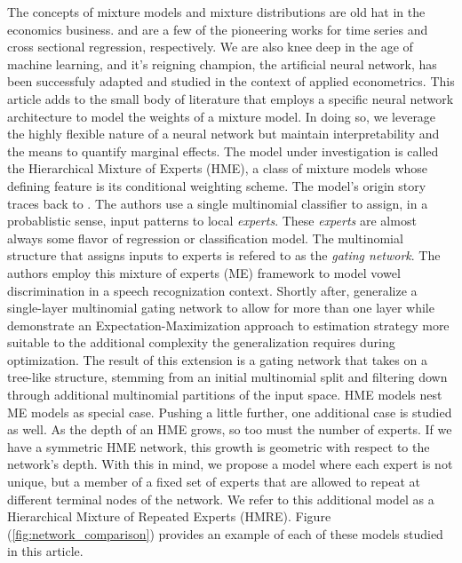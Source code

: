\documentclass[12pt]{article}
\begin{document}
The concepts of mixture models and mixture distributions are old hat
in the economics business. \cite{Hamilton1989} and \cite{GoldfeldQuant1973}
are a few of the pioneering works for time series and cross sectional
regression, respectively. We are also knee deep in the age of machine
learning, and it's reigning champion, the artificial neural network, has
been successfuly adapted and studied in the context of applied econometrics.
This article adds to the small body of literature that employs a specific
neural network architecture to model the weights of a mixture model. In doing
so, we leverage the highly flexible nature of a neural network but maintain
interpretability and the means to quantify marginal effects.
The model under investigation is called the Hierarchical Mixture
of Experts (HME), a class of mixture models whose defining feature is 
its conditional weighting scheme. The model's origin story traces back to \cite{JJNH1991}.
The authors use a single multinomial classifier to assign, in a probablistic
sense, input patterns to local \textit{experts}. These \textit{experts} are
almost always some flavor of regression or classification model.
The multinomial structure that assigns inputs to experts is
refered to as the \textit{gating network}. The authors employ this
mixture of experts (ME) framework to model vowel discrimination in a speech
recognization context. Shortly after, \cite{JordanJacobs1992}
generalize a single-layer multinomial gating network
to allow for more than one layer while \cite{JordanJacobs1993} demonstrate
an Expectation-Maximization approach to estimation strategy more suitable to the additional complexity
the generalization requires during optimization. The result
of this extension is a gating network that takes on a tree-like structure,
stemming from an initial multinomial split and filtering down through additional
multinomial partitions of the input space. HME models nest ME models as special case.
Pushing a little further, one additional case is studied as well. As the depth of an HME
grows, so too must the number of experts. If we have a symmetric HME network,
this growth is geometric with respect to the network's depth. With this in mind,
we propose a model where each expert is not unique, but a member of a fixed
set of experts that are allowed to repeat at different terminal nodes of the
network. We refer to this additional model as a Hierarchical Mixture of Repeated
Experts (HMRE). Figure (\ref{fig:network_comparison}) provides an example
of each of these models studied in this article.
\end{document}
